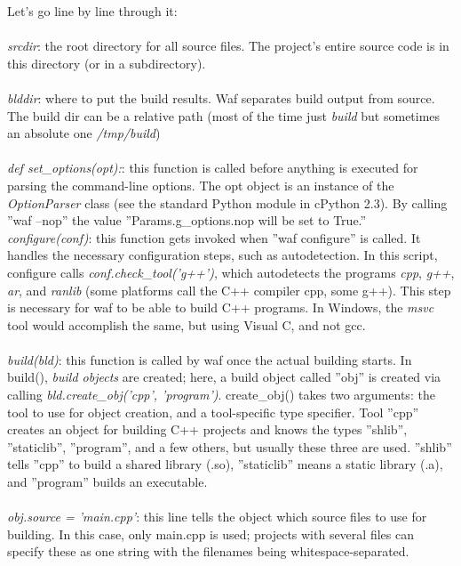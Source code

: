 \documentclass[a4paper,10pt]{article}
\begin{document}
Let's go line by line through it:\\
\\
\emph{srcdir}: the root directory for all source files. The project's entire source code is in this directory (or in a subdirectory).\\
\\
\emph{blddir}: where to put the build results. Waf separates build output from source. The build dir can be a relative path (most of the time just \emph{build} but sometimes an absolute one \emph{/tmp/build})\\
\\
\emph{def set\_options(opt):}: this function is called before anything is executed for parsing the command-line options. The opt object is an instance of the \emph{OptionParser} class (see the standard Python module in cPython 2.3). By calling ''waf --nop'' the value ''Params.g\_options.nop will be set to True.''
\\
\emph{configure(conf)}: this function gets invoked when ''waf configure'' is called. It handles the necessary configuration steps, such as autodetection. In this script, configure calls \emph{conf.check\_tool('g++')}, which autodetects the programs \emph{cpp}, \emph{g++}, \emph{ar}, and \emph{ranlib} (some platforms call the C++ compiler cpp, some g++). This step is necessary for waf to be able to build C++ programs. In Windows, the \emph{msvc} tool would accomplish the same, but using Visual C, and not gcc.\\
\\
\emph{build(bld)}: this function is called by waf once the actual building starts.
In build(), \emph{build objects} are created; here, a build object called ''obj'' is created via calling \emph{bld.create\_obj('cpp', 'program')}. create\_obj() takes two arguments: the tool to use for object creation, and a tool-specific type specifier. Tool ''cpp'' creates an object for building C++ projects and knows the types ''shlib'', ''staticlib'', ''program'', and a few others, but usually these three are used. ''shlib'' tells ''cpp'' to build a shared library (.so), ''staticlib'' means a static library (.a), and ''program'' builds an executable.\\
\\
\emph{obj.source = 'main.cpp'}: this line tells the object which source files to use for building. In this case, only main.cpp is used; projects with several files can specify these as one string with the filenames being whitespace-separated.\\
\end{document}
